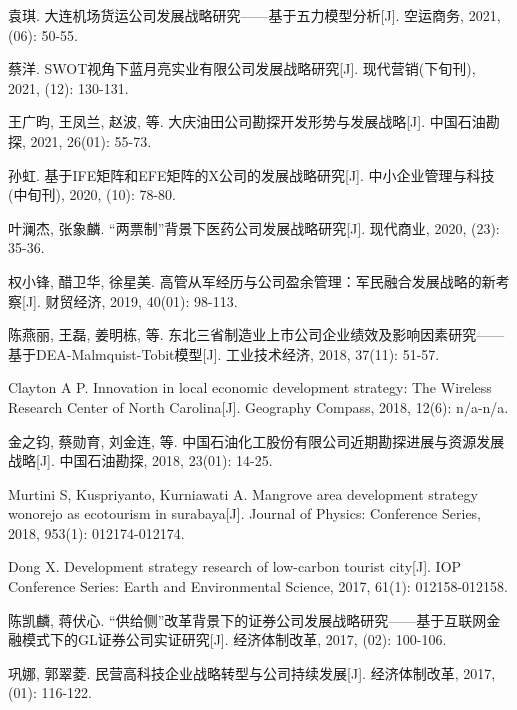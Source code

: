 \documentclass[UTF8, a4paper, 11pt]{ctexart}
\begin{document}
\begin{UnifiedBox}[height=25.4cm]
\begin{enumerate}[label={[}\arabic*{]}, leftmargin=2em, itemsep=0.15em, parsep=0pt]
\item 袁琪. 大连机场货运公司发展战略研究——基于五力模型分析[J]. 空运商务, 2021, (06): 50-55.

\item 蔡洋. SWOT视角下蓝月亮实业有限公司发展战略研究[J]. 现代营销(下旬刊), 2021, (12): 130-131.

\item 王广昀, 王凤兰, 赵波, 等. 大庆油田公司勘探开发形势与发展战略[J]. 中国石油勘探, 2021, 26(01): 55-73.

\item 孙虹. 基于IFE矩阵和EFE矩阵的X公司的发展战略研究[J]. 中小企业管理与科技(中旬刊), 2020, (10): 78-80.

\item 叶澜杰, 张象麟. ``两票制''背景下医药公司发展战略研究[J]. 现代商业, 2020, (23): 35-36.

\item 权小锋, 醋卫华, 徐星美. 高管从军经历与公司盈余管理：军民融合发展战略的新考察[J]. 财贸经济, 2019, 40(01): 98-113.

\item 陈燕丽, 王磊, 姜明栋, 等. 东北三省制造业上市公司企业绩效及影响因素研究——基于DEA-Malmquist-Tobit模型[J]. 工业技术经济, 2018, 37(11): 51-57.

\item Clayton A P. Innovation in local economic development strategy: The Wireless Research Center of North Carolina[J]. Geography Compass, 2018, 12(6): n/a-n/a.

\item 金之钧, 蔡勋育, 刘金连, 等. 中国石油化工股份有限公司近期勘探进展与资源发展战略[J]. 中国石油勘探, 2018, 23(01): 14-25.

\item Murtini S, Kuspriyanto, Kurniawati A. Mangrove area development strategy wonorejo as ecotourism in surabaya[J]. Journal of Physics: Conference Series, 2018, 953(1): 012174-012174.

\item Dong X. Development strategy research of low-carbon tourist city[J]. IOP Conference Series: Earth and Environmental Science, 2017, 61(1): 012158-012158.

\item 陈凯麟, 蒋伏心. ``供给侧''改革背景下的证券公司发展战略研究——基于互联网金融模式下的GL证券公司实证研究[J]. 经济体制改革, 2017, (02): 100-106.

\item 巩娜, 郭翠菱. 民营高科技企业战略转型与公司持续发展[J]. 经济体制改革, 2017, (01): 116-122.


\end{enumerate}
\end{UnifiedBox}
\end{document}
